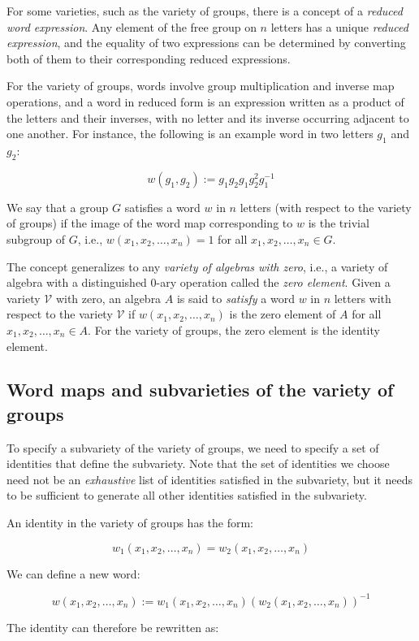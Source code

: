\documentclass{ucetd}
\begin{document}
For some varieties, such as the variety of groups, there is a concept
of a {\em reduced word expression}. Any element of the free group on
$n$ letters has a unique {\em reduced expression}, and the equality of
two expressions can be determined by converting both of them to their
corresponding reduced expressions.

For the variety of groups, words involve group multiplication and
inverse map operations, and a word in reduced form is an expression
written as a product of the letters and their inverses, with no letter
and its inverse occurring adjacent to one another. For instance, the
following is an example word in two letters $g_1$ and $g_2$:

$$w(g_1,g_2) := g_1g_2g_1g_2^2g_1^{-1}$$

We say that a group $G$ satisfies a word $w$ in $n$ letters (with
respect to the variety of groups) if the image of the word map
corresponding to $w$ is the trivial subgroup of $G$, i.e.,
$w(x_1,x_2,\dots,x_n) = 1$ for all $x_1,x_2,\dots,x_n \in G$. 

The concept generalizes to any {\em variety of algebras with zero},
i.e., a variety of algebra with a distinguished 0-ary operation called
the {\em zero element}. Given a variety $\mathcal{V}$ with zero, an
algebra $A$ is said to {\em satisfy} a word $w$ in $n$ letters with
respect to the variety $\mathcal{V}$ if $w(x_1,x_2,\dots,x_n)$ is the
zero element of $A$ for all $x_1,x_2,\dots,x_n \in A$. For the variety
of groups, the zero element is the identity element.
\subsection{Word maps and subvarieties of the variety of groups}

To specify a subvariety of the variety of groups, we need to specify a
set of identities that define the subvariety. Note that the set of
identities we choose need not be an {\em exhaustive} list of
identities satisfied in the subvariety, but it needs to be sufficient
to generate all other identities satisfied in the subvariety.

An identity in the variety of groups has the form:

$$w_1(x_1,x_2,\dots,x_n) = w_2(x_1,x_2,\dots,x_n)$$

We can define a new word:

$$w(x_1,x_2,\dots,x_n) := w_1(x_1,x_2,\dots,x_n)(w_2(x_1,x_2,\dots,x_n))^{-1}$$

The identity can therefore be rewritten as:
\end{document}
